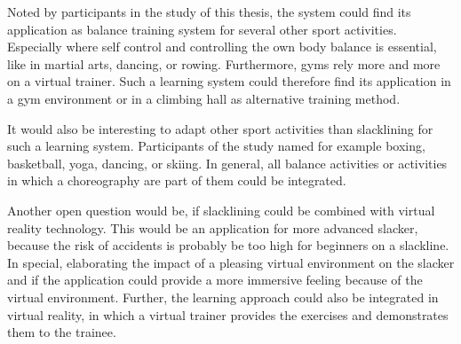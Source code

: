 Noted by participants in the study of this thesis, the system could find its application as balance training system for several other sport activities.
Especially where self control and controlling the own body balance is essential, like in martial arts, dancing, or rowing.
Furthermore, gyms rely more and more on a virtual trainer.
Such a learning system could therefore find its application in a gym environment or in a climbing hall as alternative training method.

It would also be interesting to adapt other sport activities than slacklining for such a learning system.
Participants of the study named for example boxing, basketball, yoga, dancing, or skiing.
In general, all balance activities or activities in which a choreography are part of them could be integrated.

Another open question would be, if slacklining could be combined with virtual reality technology.
This would be an application for more advanced slacker, because the risk of accidents is probably be too high for beginners on a slackline.
In special, elaborating the impact of a pleasing virtual environment on the slacker and if the application could provide a more immersive feeling because of the virtual environment.
Further, the learning approach could also be integrated in virtual reality, in which a virtual trainer provides the exercises and demonstrates them to the trainee.

% 



